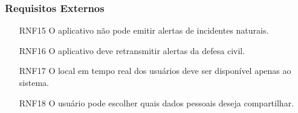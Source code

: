 \documentclass[12pt]{article}
\begin{document}
\subsubsection{Requisitos Externos}
\begin{enumerate}
    \item [RNF15] O aplicativo não pode emitir alertas de incidentes naturais.%
    \item [RNF16] O aplicativo deve retransmitir alertas da defesa civil.%
    \item [RNF17] O local em tempo real dos usuários deve ser disponível apenas ao sistema.%
    \item [RNF18] O usuário pode escolher quais dados pessoais deseja compartilhar.%
\end{enumerate}
\end{document}
